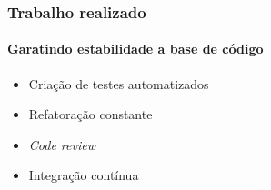 \documentclass[aspectratio=169]{beamer}
\begin{document}
\begin{frame}
	\frametitle{Trabalho realizado}
	\framesubtitle{Garatindo estabilidade a base de código}
	
	\begin{itemize}
		
		\item Criação de testes automatizados
		
		\item Refatoração constante
		
		\item \textit{Code review}
	
		\item Integração contínua
		
	\end{itemize}
	
\end{frame}
\end{document}
